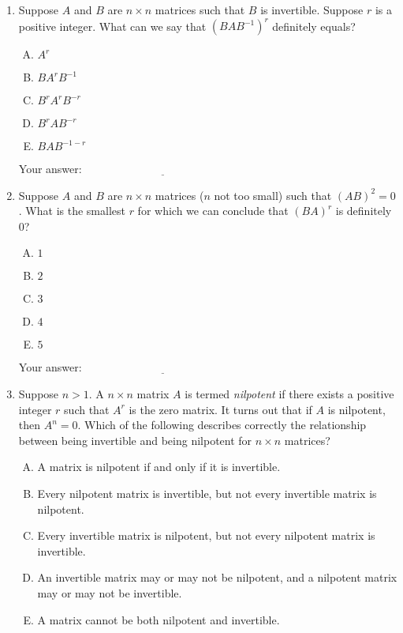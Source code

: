 \documentclass[10pt]{amsart}
\begin{document}
\begin{enumerate}

\item Suppose $A$ and $B$ are $n \times n$ matrices such that $B$ is
  invertible. Suppose $r$ is a positive integer. What can we say that
  $(BAB^{-1})^r$ definitely equals?

  \begin{enumerate}[(A)]
  \item $A^r$
  \item $BA^rB^{-1}$
  \item $B^rA^rB^{-r}$
  \item $B^rAB^{-r}$
  \item $BAB^{-1-r}$
  \end{enumerate}

   \vspace{0.1in}
   Your answer: $\underline{\qquad\qquad\qquad\qquad\qquad\qquad\qquad}$
   \vspace{0.1in}

\item Suppose $A$ and $B$ are $n \times n$ matrices ($n$ not too
  small) such that $(AB)^2 = 0$. What is the smallest $r$ for which we
  can conclude that $(BA)^r$ is definitely $0$?

  \begin{enumerate}[(A)]
  \item $1$
  \item $2$
  \item $3$
  \item $4$
  \item $5$
  \end{enumerate}

  \vspace{0.1in}
  Your answer: $\underline{\qquad\qquad\qquad\qquad\qquad\qquad\qquad}$
  \vspace{0.1in}

\item Suppose $n > 1$. A $n \times n$ matrix $A$ is termed {\em
  nilpotent} if there exists a positive integer $r$ such that $A^r$ is
  the zero matrix. It turns out that if $A$ is nilpotent, then $A^n =
  0$. Which of the following describes correctly the relationship
  between being invertible and being nilpotent for $n \times n$
  matrices?

  \begin{enumerate}[(A)]
  \item A matrix is nilpotent if and only if it is invertible.
  \item Every nilpotent matrix is invertible, but not every invertible matrix is nilpotent.
  \item Every invertible matrix is nilpotent, but not every nilpotent matrix is invertible.
  \item An invertible matrix may or may not be nilpotent, and a
    nilpotent matrix may or may not be invertible.
  \item A matrix cannot be both nilpotent and invertible.
  \end{enumerate}


\end{enumerate}
\end{document}
